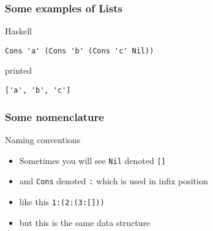 \begin{frame}[fragile]
\frametitle{Some examples of Lists}
\begin{block}{Haskell}
\begin{lstlisting}[style=haskell,basicstyle=\scriptsize\ttfamily,mathescape]
Cons 'a' (Cons 'b' (Cons 'c' Nil))
\end{lstlisting}
\end{block}
\begin{block}{printed}
\begin{lstlisting}[style=haskell,basicstyle=\scriptsize\ttfamily,mathescape]
['a', 'b', 'c']
\end{lstlisting}
\end{block}
\end{frame}

\begin{frame}
\frametitle{Some nomenclature}
\begin{block}{Naming conventions}
\begin{itemize}
\item<1-> Sometimes you will see \lstinline{Nil} denoted \lstinline{[]}
\item<2-> and \lstinline{Cons} denoted \lstinline{:} which is used in infix position
\item<3-> like this \lstinline{1:(2:(3:[]))}
\item<4-> but this is the same data structure
\end{itemize}
\end{block}
\end{frame}
